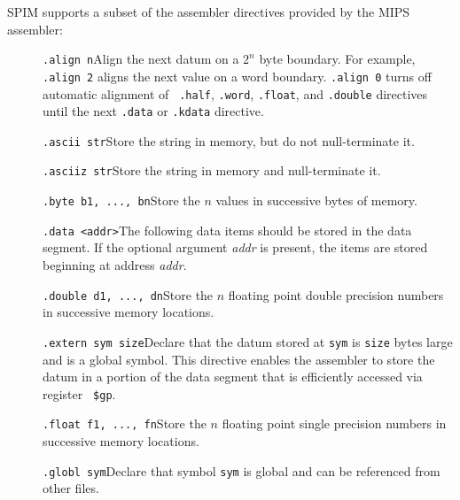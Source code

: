 \documentclass[11pt]{article}
\begin{document}
SPIM supports a subset of the assembler directives provided by the
MIPS assembler:
\begin{description}
  \item [] {\tt .align n}\newline Align the next datum on a $2^n$ byte
boundary.  For example, {\tt .align 2} aligns the next value on a word
boundary.  {\tt .align 0} turns off automatic alignment of {\tt
.half}, {\tt .word}, {\tt .float}, and {\tt .double} directives until
the next {\tt .data} or {\tt .kdata} directive.

  \item [] {\tt .ascii str}\newline Store the string in memory, but do
not null-terminate it.

  \item [] {\tt .asciiz str}\newline Store the string in memory and
null-terminate it.

  \item [] {\tt .byte b1, ..., bn}\newline Store the $n$ values in
successive bytes of memory.

  \item [] {\tt .data <addr>}\newline The following data items should
be stored in the data segment.  If the optional argument {\em addr\/}
is present, the items are stored beginning at address {\em addr\/}.

  \item [] {\tt .double d1, ..., dn}\newline Store the $n$ floating
point double precision numbers in successive memory locations.

  \item [] {\tt .extern sym size}\newline Declare that the datum
stored at {\tt sym} is {\tt size} bytes large and is a global symbol.
This directive enables the assembler to store the datum in a portion
of the data segment that is efficiently accessed via register {\tt
\$gp}.

  \item [] {\tt .float f1, ..., fn}\newline Store the $n$ floating
point single precision numbers in successive memory locations.

  \item [] {\tt .globl sym}\newline Declare that symbol {\tt sym} is
global and can be referenced from other files.


\end{description}
\end{document}
